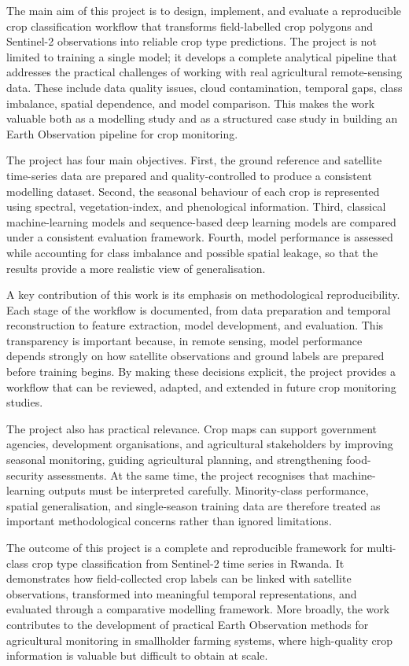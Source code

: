 The main aim of this project is to design, implement, and evaluate a
reproducible crop classification workflow that transforms field-labelled crop
polygons and Sentinel-2 observations into reliable crop type predictions. The
project is not limited to training a single model; it develops a complete
analytical pipeline that addresses the practical challenges of working with
real agricultural remote-sensing data. These include data quality issues, cloud
contamination, temporal gaps, class imbalance, spatial dependence, and model
comparison. This makes the work valuable both as a modelling study and as a
structured case study in building an Earth Observation pipeline for crop
monitoring.

The project has four main objectives. First, the ground reference and satellite
time-series data are prepared and quality-controlled to produce a consistent
modelling dataset. Second, the seasonal behaviour of each crop is represented
using spectral, vegetation-index, and phenological information. Third,
classical machine-learning models and sequence-based deep learning models are
compared under a consistent evaluation framework. Fourth, model performance is
assessed while accounting for class imbalance and possible spatial leakage, so
that the results provide a more realistic view of generalisation.

A key contribution of this work is its emphasis on methodological
reproducibility. Each stage of the workflow is documented, from data
preparation and temporal reconstruction to feature extraction, model
development, and evaluation. This transparency is important because, in remote
sensing, model performance depends strongly on how satellite observations and
ground labels are prepared before training begins. By making these decisions
explicit, the project provides a workflow that can be reviewed, adapted, and
extended in future crop monitoring studies.

The project also has practical relevance. Crop maps can support government
agencies, development organisations, and agricultural stakeholders by improving
seasonal monitoring, guiding agricultural planning, and strengthening
food-security assessments. At the same time, the project recognises that
machine-learning outputs must be interpreted carefully. Minority-class
performance, spatial generalisation, and single-season training data are
therefore treated as important methodological concerns rather than ignored
limitations.

The outcome of this project is a complete and reproducible framework for
multi-class crop type classification from Sentinel-2 time series in Rwanda. It
demonstrates how field-collected crop labels can be linked with satellite
observations, transformed into meaningful temporal representations, and
evaluated through a comparative modelling framework. More broadly, the work
contributes to the development of practical Earth Observation methods for
agricultural monitoring in smallholder farming systems, where high-quality crop
information is valuable but difficult to obtain at scale.

